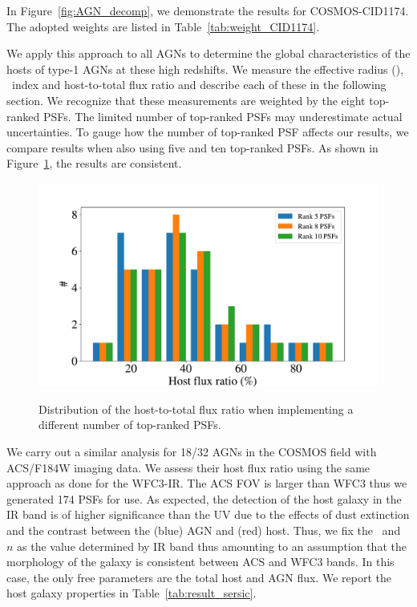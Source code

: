 \documentclass[apj]{emulateapj}
\begin{document}
\noindent In Figure~\ref{fig:AGN_decomp}, we demonstrate the results for COSMOS-CID1174. The adopted weights are listed in Table~\ref{tab:weight_CID1174}. 





We apply this approach to all AGNs to determine the global characteristics of the hosts of type-1 AGNs at these high redshifts. We measure the effective radius (\Reff), \sersic\ index and host-to-total flux ratio and describe each of these in the following section. We recognize that these measurements are weighted by the eight top-ranked PSFs. The limited number of top-ranked PSFs may underestimate actual uncertainties. To gauge how the number of top-ranked PSF affects our results, we compare results when also using five and ten top-ranked PSFs. As shown in Figure~\ref{fig:hist_compare}, the results are consistent.

\begin{figure}
\centering
{
\includegraphics[height=0.25\textwidth]{fig/hist_compare.pdf}
}
\caption{\label{fig:hist_compare} 
Distribution of the host-to-total flux ratio when implementing a different number of top-ranked PSFs.}
\end{figure} 


We carry out a similar analysis for 18/32 AGNs in the COSMOS field with ACS/F184W imaging data. We assess their host flux ratio using the same approach as done for the WFC3-IR. The ACS FOV is larger than WFC3 thus we generated 174 PSFs for use. As expected, the detection of the host galaxy in the IR band is of higher significance than the UV due to the effects of dust extinction and the contrast between the (blue) AGN and (red) host. Thus, we fix the \Reff\ and \sersic\ $n$ as the value determined by IR band thus amounting to an assumption that the morphology of the galaxy is consistent between ACS and WFC3 bands. In this case, the only free parameters are the total host and AGN flux. We report the host galaxy properties in Table~\ref{tab:result_sersic}.
\end{document}
